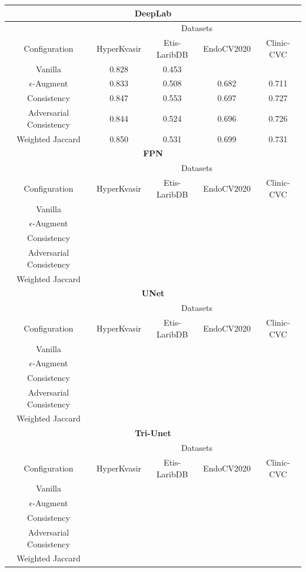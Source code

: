 \begin{center}
        \begin{tabular}{|c|c|c|c|c|}
        \hline
        \multicolumn{5}{|c|}{\textbf{DeepLab}}\\
        \hline
        &\multicolumn{4}{|c|}{Datasets}\\
        \cline{2-5}
        Configuration&HyperKvasir&Etis-LaribDB&EndoCV2020 & Clinic-CVC \\
        \hline
        Vanilla& 0.828 & 0.453 & &\\
        \hline
        \(\epsilon\)-Augment& 0.833 & 0.508 & 0.682 & 0.711 \\
        Consistency & 0.847 & 0.553 & 0.697 & 0.727 \\
        Adversarial Consistency & 0.844&0.524&0.696&0.726 \\
        Weighted Jaccard&0.850&0.531&0.699&0.731\\
        \hline
        \multicolumn{5}{|c|}{\textbf{FPN}}\\
        \hline
        &\multicolumn{4}{|c|}{Datasets}\\
        \cline{2-5}
        Configuration&HyperKvasir&Etis-LaribDB&EndoCV2020 & Clinic-CVC \\
        \hline
        Vanilla&  &  & &\\
        \hline
        \(\epsilon\)-Augment& & & & \\
        Consistency & & && \\
        Adversarial Consistency&&&& \\
        Weighted Jaccard&&&&\\
        \hline
        \multicolumn{5}{|c|}{\textbf{UNet}}\\
        \hline
        &\multicolumn{4}{|c|}{Datasets}\\
        \cline{2-5}
        Configuration&HyperKvasir&Etis-LaribDB&EndoCV2020 & Clinic-CVC \\
        \hline
        Vanilla&  &  & &\\
        \(\epsilon\)-Augment& & & & \\
        Consistency & & && \\
        Adversarial Consistency&&&& \\
        Weighted Jaccard&&&&\\
        \hline
        \multicolumn{5}{|c|}{\textbf{Tri-Unet}}\\
        \hline
        &\multicolumn{4}{|c|}{Datasets}\\
        \cline{2-5}
        Configuration&HyperKvasir&Etis-LaribDB&EndoCV2020 & Clinic-CVC \\
        \hline
        Vanilla&  &  & &\\
        \(\epsilon\)-Augment& & & & \\
        Consistency & & && \\
        Adversarial Consistency&&&& \\
        Weighted Jaccard&&&&\\
        \hline
        \end{tabular}
    \end{center}
    
